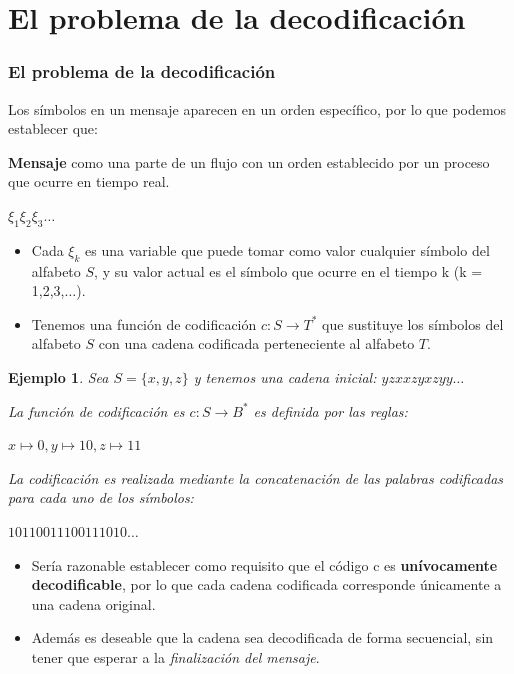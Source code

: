 \documentclass{beamer}
\newtheorem{ejemplo} [Ejemplo] {Ejemplo}
\begin{document}
\section{El problema de la decodificación}

\begin{frame} \frametitle{El problema de la decodificación}     \small
 
Los símbolos en un mensaje aparecen en un orden específico, por lo que podemos establecer que:
\begin{center}
\textbf{Mensaje} como una parte de un flujo con un orden establecido por un proceso que ocurre en tiempo real.

$\xi_{1}\xi_{2}\xi_{3}\ldots$
\end{center}

\begin{itemize}
\item Cada $\xi_{k}$ es una variable que puede tomar como valor cualquier símbolo del alfabeto $S$, y su valor actual es el símbolo que ocurre en el tiempo k  (k = 1,2,3,$\ldots$).

\item Tenemos una función de codificación 
$c: S\rightarrow T^{*}$ que sustituye los símbolos del alfabeto $S$ con una cadena codificada perteneciente al alfabeto $T$.
\end{itemize}

\end{frame}




\begin{frame}      \small
 
\begin{ejemplo} 

Sea $S = \{x, y, z\}$ y tenemos una cadena inicial: $yzxxzyxzyy \ldots$

La función de codificación es $c: S\rightarrow B^{*}$ es definida por las reglas:
\begin{center} $x \mapsto 0,  y\mapsto 10, z \mapsto 11 $ \end{center}
La codificación es realizada mediante la concatenación de las palabras codificadas para cada uno de los símbolos: 
\begin{center}
$10110011100111010 \ldots$	
\end{center}
\end{ejemplo}

\begin{itemize}
\item Sería razonable establecer como requisito que el código c es \textbf{unívocamente decodificable}, por lo que cada cadena codificada corresponde únicamente a una cadena original. 

\item Además es deseable que la cadena sea decodificada de forma secuencial, sin tener que esperar a la \textit{finalización del mensaje}.

\end{itemize}

\end{frame}
\end{document}
